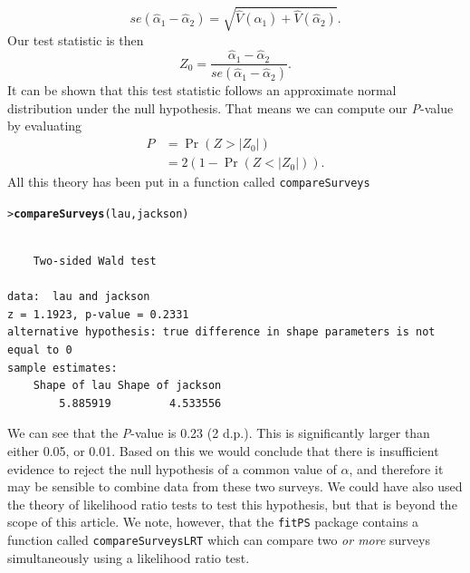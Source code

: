 \documentclass{article}\usepackage[]{graphicx}\usepackage[]{xcolor}
\makeatletter
\newcommand{\hlstd}[1]{\textcolor[rgb]{0.345,0.345,0.345}{#1}}%
\newcommand{\hlkwd}[1]{\textcolor[rgb]{0.737,0.353,0.396}{\textbf{#1}}}%
\newenvironment{kframe}{%
 \def\at@end@of@kframe{}%
 \ifinner\ifhmode%
  \def\at@end@of@kframe{\end{minipage}}%
  \begin{minipage}{\columnwidth}%
 \fi\fi%
 \def\FrameCommand##1{\hskip\@totalleftmargin \hskip-\fboxsep
 \colorbox{shadecolor}{##1}\hskip-\fboxsep
     \hskip-\linewidth \hskip-\@totalleftmargin \hskip\columnwidth}%
 \MakeFramed {\advance\hsize-\width
   \@totalleftmargin\z@ \linewidth\hsize
   \@setminipage}}%
 {\par\unskip\endMakeFramed%
 \at@end@of@kframe}
\newenvironment{knitrout}{}{} %
\newcommand{\rcode}[1]{\lstinline[language=R,basicstyle=\normalsize\ttfamily]!#1!}
\makeatother
\begin{document}
\[
se(\hat{\alpha}_{1}-\hat{\alpha}_{2}) = \sqrt{\hat{V}(\hat{\alpha}_1)+\hat{V}(\hat{\alpha}_2)}.
\]
Our test statistic is then
\[
Z_0 = \frac{\hat{\alpha}_{1}-\hat{\alpha}_{2}}{se(\hat{\alpha}_{1}-\hat{\alpha}_{2})}.
\]
It can be shown that this test statistic follows an approximate normal distribution under the null hypothesis. That means we can compute our \emph{P}-value by evaluating
\begin{align*}
P&=\Pr(Z > |Z_0|) \\
&=2(1 - \Pr(Z < |Z_0|)).
\end{align*}
All this theory has been put in a function called \rcode{compareSurveys}
\begin{knitrout}
\color{fgcolor}\begin{kframe}
\begin{alltt}
\hlstd{> }\hlkwd{compareSurveys}\hlstd{(lau, jackson)}
\end{alltt}
\begin{verbatim}

	Two-sided Wald test

data:  lau and jackson
z = 1.1923, p-value = 0.2331
alternative hypothesis: true difference in shape parameters is not equal to 0
sample estimates:
    Shape of lau Shape of jackson 
        5.885919         4.533556 
\end{verbatim}
\end{kframe}
\end{knitrout}\noindent
We can see that the \emph{P}-value is 0.23 (2 d.p.). This is significantly larger than either 0.05, or 0.01. Based on this we would conclude that there is insufficient evidence to reject the null hypothesis of a common value of $\alpha$, and therefore it may be sensible to combine data from these two surveys. We could have also used the theory of likelihood ratio tests \citep{wiki:lrt} to test this hypothesis, but that is beyond the scope of this article. We note, however, that the \rcode{fitPS} package contains a function called \rcode{compareSurveysLRT} which can compare two \emph{or more} surveys simultaneously using a likelihood ratio test.
\end{document}
